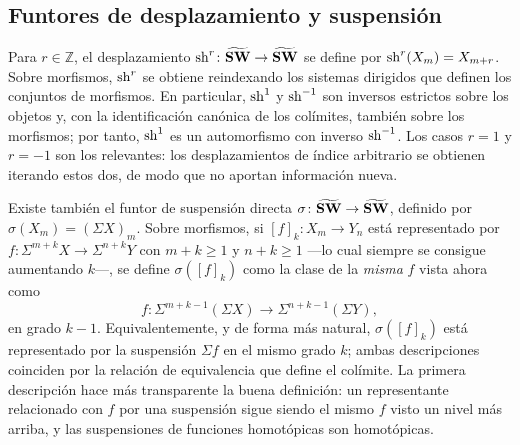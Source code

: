 \subsection{Funtores de desplazamiento y suspensión}
Para $r\in\mathbb Z$, el desplazamiento $\operatorname{sh}^r\colon\widetilde{\mathbf{SW}}\to\widetilde{\mathbf{SW}}$ se define por $\operatorname{sh}^r(X_m)=X_{m+r}$. Sobre morfismos, $\operatorname{sh}^r$ se obtiene reindexando los sistemas dirigidos que definen los conjuntos de morfismos. En particular, $\operatorname{sh}^1$ y $\operatorname{sh}^{-1}$ son inversos estrictos sobre los objetos y, con la identificación canónica de los colímites, también sobre los morfismos; por tanto, $\operatorname{sh}^1$ es un automorfismo con inverso $\operatorname{sh}^{-1}$. Los casos $r=1$ y $r=-1$ son los relevantes: los desplazamientos de índice arbitrario se obtienen iterando estos dos, de modo que no aportan información nueva.

Existe también el funtor de suspensión directa $\sigma\colon\widetilde{\mathbf{SW}}\to\widetilde{\mathbf{SW}}$, definido por $\sigma(X_m)=(\Sigma X)_m$. Sobre morfismos, si $[f]_k\colon X_m\to Y_n$ está representado por $f\colon\Sigma^{m+k}X\to\Sigma^{n+k}Y$ con $m+k\ge1$ y $n+k\ge1$ ---lo cual siempre se consigue aumentando $k$---, se define $\sigma([f]_k)$ como la clase de la \emph{misma} $f$ vista ahora como
\[
f\colon\Sigma^{m+k-1}(\Sigma X)\longrightarrow\Sigma^{n+k-1}(\Sigma Y),
\]
en grado $k-1$. Equivalentemente, y de forma más natural, $\sigma([f]_k)$ está representado por la suspensión $\Sigma f$ en el mismo grado $k$; ambas descripciones coinciden por la relación de equivalencia que define el colímite. La primera descripción hace más transparente la buena definición: un representante relacionado con $f$ por una suspensión sigue siendo el mismo $f$ visto un nivel más arriba, y las suspensiones de funciones homotópicas son homotópicas.

